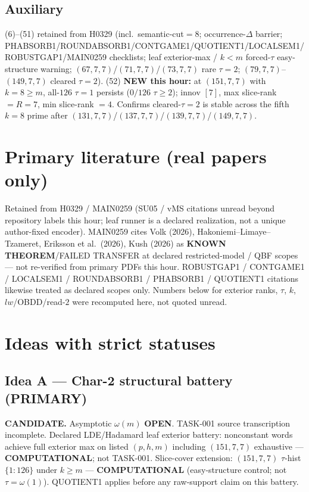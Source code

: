 \documentclass[11pt]{article}
\begin{document}
\subsection*{Auxiliary}
(6)--(51) retained from H0329 (incl.\ semantic-cut$=8$; occurrence-$\Delta$ barrier;
PHABSORB1/ROUNDABSORB1/CONTGAME1/QUOTIENT1/LOCALSEM1/ROBUSTGAP1/MAIN0259 checklists;
leaf exterior-max / $k{<}m$ forced-$\tau$ easy-structure warning;
$(67,7,7)$/$(71,7,7)$/$(73,7,7)$ rare $\tau{=}2$; $(79,7,7)$--$(149,7,7)$ cleared $\tau{=}2$).
(52) \textbf{NEW this hour:} at $(151,7,7)$ with $k{=}8{\ge}m$, all-$126$ $\tau{=}1$ persists
($0/126$ $\tau{\ge}2$); innov $[7]$, max slice-rank $=R{=}7$, min slice-rank $=4$.
Confirms cleared-$\tau{=}2$ is stable across the fifth $k{=}8$ prime after $(131,7,7)$/$(137,7,7)$/$(139,7,7)$/$(149,7,7)$.

\section*{Primary literature (real papers only)}
Retained from H0329 / MAIN0259 (SU05 / vMS citations unread beyond repository labels this hour;
leaf runner is a declared realization, not a unique author-fixed encoder).
MAIN0259 cites Volk (2026), Hakoniemi--Limaye--Tzameret, Eriksson et al.\ (2026), Kush (2026)
as \textbf{KNOWN THEOREM}/FAILED TRANSFER at declared restricted-model / QBF scopes ---
not re-verified from primary PDFs this hour.
ROBUSTGAP1 / CONTGAME1 / LOCALSEM1 / ROUNDABSORB1 / PHABSORB1 / QUOTIENT1 citations likewise
treated as declared scopes only.
Numbers below for exterior ranks, $\tau$, $k$, $lw$/OBDD/read-$2$
were recomputed here, not quoted unread.

\section*{Ideas with strict statuses}
\subsection*{Idea A --- Char-2 structural battery (PRIMARY)}
\textbf{CANDIDATE.} Asymptotic $\omega(m)$ \textbf{OPEN}. TASK-001 source transcription incomplete.
Declared LDE/Hadamard leaf exterior battery: nonconstant words achieve full exterior max on
listed $(p,h,m)$ including $(151,7,7)$ exhaustive --- \textbf{COMPUTATIONAL}; not TASK-001.
Slice-cover extension: $(151,7,7)$ $\tau$-hist $\{1{:}126\}$ under $k{\ge}m$ ---
\textbf{COMPUTATIONAL} (easy-structure control; not $\tau=\omega(1)$).
QUOTIENT1 applies before any raw-support claim on this battery.
\end{document}
